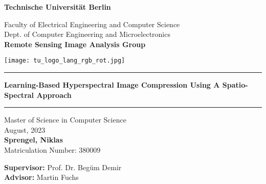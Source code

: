 \thispagestyle{empty}
\begin{center}

{\LARGE \textbf{Technische Universit{\"a}t Berlin}}

\vspace{0.6cm}

{\large Faculty of Electrical Engineering and Computer Science\\[1mm]}
{\large Dept. of Computer Engineering and Microelectronics\\[1mm]}
{\large \textbf{Remote Sensing Image Analysis Group}\\[5mm]}

\vspace*{0.5cm}

\texttt{[image: tu\_logo\_lang\_rgb\_rot.jpg]} %

\vspace{0.2cm}
\begin{center}
\rule{0.85\textwidth}{.4pt}
\end{center}
\vspace{0.2cm}
{\LARGE \textbf{Learning-Based Hyperspectral Image Compression Using A Spatio-Spectral Approach}} %
\begin{center}
\rule{0.85\textwidth}{.4pt}
\end{center}
\vspace{0.5cm}
{\LARGE Master of Science in Computer Science}\\
\vspace*{0.2cm}
{\large August, 2023}\\ %
\vspace*{0.5cm}
{\LARGE \textbf{Sprengel, Niklas}}
\\
\vspace*{0.5cm}
{\large Matriculation Number: 380009} \\
\vspace*{0.5cm}
\begin{flushleft}
\hspace*{1.2cm}
{\large \textbf{Supervisor:}} \hspace*{0.5cm} {\large Prof. Dr. Beg{\"u}m Demir}\\
\vspace*{0.5cm}
\hspace*{1.2cm}
{\large \textbf{Advisor:}} \hspace*{1.0cm} {\large Martin Fuchs}
\vspace{2cm}
\end{flushleft}

\end{center}



